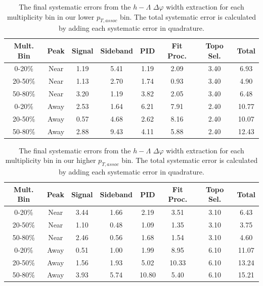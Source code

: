 \documentclass[ALICE,manyauthors]{ALICE_analysis_notes}
\begin{document}
\begin{table}[ht]
\centering
\begin{tabular}{|c|c||c|c|c|c|c||c|}
\hline
Mult. Bin & Peak & Signal & Sideband & PID & Fit Proc. & Topo Sel. & Total \\
\hline

0-20\% & Near & 1.19 & 5.41 & 1.19 & 2.09 & 3.40 & 6.93 \\
20-50\% & Near & 1.13 & 2.70 & 1.74 & 0.93 & 3.40 & 4.90 \\
50-80\% & Near & 3.20 & 1.19 & 3.82 & 2.05 & 3.40 & 6.48 \\
0-20\% & Away & 2.53 & 1.64 & 6.21 & 7.91 & 2.40 & 10.77 \\
20-50\% & Away & 0.57 & 4.68 & 2.62 & 8.16 & 2.40 & 10.07 \\
50-80\% & Away & 2.88 & 9.43 & 4.11 & 5.88 & 2.40 & 12.43 \\

\hline
\end{tabular}
\caption{The final systematic errors from the $h-\Lambda$ $\Delta\varphi$ width extraction  for each multiplicity bin in our lower $p_{T, assoc}$ bin. The total systematic error is calculated by adding each systematic error in quadrature.}
\label{h_lambda_width_systematic_table_lowpt}
\end{table}

\begin{table}[ht]
\centering
\begin{tabular}{|c|c||c|c|c|c|c||c|}
\hline
Mult. Bin & Peak & Signal & Sideband & PID & Fit Proc. & Topo Sel. & Total \\
\hline
0-20\% & Near & 3.44 & 1.66 & 2.19 & 3.51 & 3.10 & 6.43 \\
20-50\% & Near & 1.10 & 0.48 & 1.09 & 1.35 & 3.10 & 3.75 \\
50-80\% & Near & 2.46 & 0.56 & 1.68 & 1.54 & 3.10 & 4.60 \\
0-20\% & Away & 0.51 & 1.00 & 1.99 & 8.95 & 6.10 & 11.07 \\
20-50\% & Away & 1.56 & 1.93 & 5.02 & 10.33 & 6.10 & 13.24 \\
50-80\% & Away & 3.93 & 5.74 & 10.80 & 5.40 & 6.10 & 15.21 \\
\hline
\end{tabular}
\caption{The final systematic errors from the $h-\Lambda$ $\Delta\varphi$ width extraction  for each multiplicity bin in our higher $p_{T, assoc}$ bin. The total systematic error is calculated by adding each systematic error in quadrature.}
\label{h_lambda_width_systematic_table_highpt}
\end{table}
\end{document}
